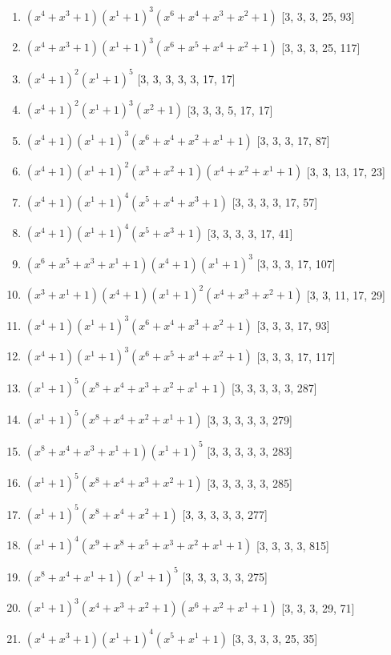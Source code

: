 \documentclass[10pt,twocolumn]{article}
\begin{document}
\begin{enumerate}
\item $(x^{4} + x^{3} + 1)(x^{1} + 1)^{3}(x^{6} + x^{4} + x^{3} + x^{2} + 1)$  [3, 3, 3, 25, 93]
\item $(x^{4} + x^{3} + 1)(x^{1} + 1)^{3}(x^{6} + x^{5} + x^{4} + x^{2} + 1)$  [3, 3, 3, 25, 117]
\item $(x^{4} + 1)^{2}(x^{1} + 1)^{5}$  [3, 3, 3, 3, 3, 17, 17]
\item $(x^{4} + 1)^{2}(x^{1} + 1)^{3}(x^{2} + 1)$  [3, 3, 3, 5, 17, 17]
\item $(x^{4} + 1)(x^{1} + 1)^{3}(x^{6} + x^{4} + x^{2} + x^{1} + 1)$  [3, 3, 3, 17, 87]
\item $(x^{4} + 1)(x^{1} + 1)^{2}(x^{3} + x^{2} + 1)(x^{4} + x^{2} + x^{1} + 1)$  [3, 3, 13, 17, 23]
\item $(x^{4} + 1)(x^{1} + 1)^{4}(x^{5} + x^{4} + x^{3} + 1)$  [3, 3, 3, 3, 17, 57]
\item $(x^{4} + 1)(x^{1} + 1)^{4}(x^{5} + x^{3} + 1)$  [3, 3, 3, 3, 17, 41]
\item $(x^{6} + x^{5} + x^{3} + x^{1} + 1)(x^{4} + 1)(x^{1} + 1)^{3}$  [3, 3, 3, 17, 107]
\item $(x^{3} + x^{1} + 1)(x^{4} + 1)(x^{1} + 1)^{2}(x^{4} + x^{3} + x^{2} + 1)$  [3, 3, 11, 17, 29]
\item $(x^{4} + 1)(x^{1} + 1)^{3}(x^{6} + x^{4} + x^{3} + x^{2} + 1)$  [3, 3, 3, 17, 93]
\item $(x^{4} + 1)(x^{1} + 1)^{3}(x^{6} + x^{5} + x^{4} + x^{2} + 1)$  [3, 3, 3, 17, 117]
\item $(x^{1} + 1)^{5}(x^{8} + x^{4} + x^{3} + x^{2} + x^{1} + 1)$  [3, 3, 3, 3, 3, 287]
\item $(x^{1} + 1)^{5}(x^{8} + x^{4} + x^{2} + x^{1} + 1)$  [3, 3, 3, 3, 3, 279]
\item $(x^{8} + x^{4} + x^{3} + x^{1} + 1)(x^{1} + 1)^{5}$  [3, 3, 3, 3, 3, 283]
\item $(x^{1} + 1)^{5}(x^{8} + x^{4} + x^{3} + x^{2} + 1)$  [3, 3, 3, 3, 3, 285]
\item $(x^{1} + 1)^{5}(x^{8} + x^{4} + x^{2} + 1)$  [3, 3, 3, 3, 3, 277]
\item $(x^{1} + 1)^{4}(x^{9} + x^{8} + x^{5} + x^{3} + x^{2} + x^{1} + 1)$  [3, 3, 3, 3, 815]
\item $(x^{8} + x^{4} + x^{1} + 1)(x^{1} + 1)^{5}$  [3, 3, 3, 3, 3, 275]
\item $(x^{1} + 1)^{3}(x^{4} + x^{3} + x^{2} + 1)(x^{6} + x^{2} + x^{1} + 1)$  [3, 3, 3, 29, 71]
\item $(x^{4} + x^{3} + 1)(x^{1} + 1)^{4}(x^{5} + x^{1} + 1)$  [3, 3, 3, 3, 25, 35]

\end{enumerate}
\end{document}
